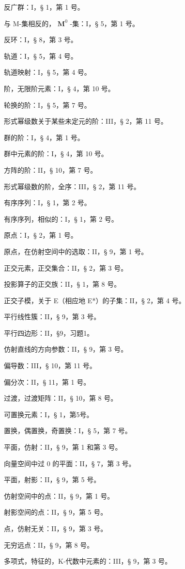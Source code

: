 反广群：I，§ 1，第 1 号。

与 M-集相反的， \(\mathbf{M}^0\) -集：I，§ 5，第 1 号。

反环：I，§ 8，第 3 号。

轨道：I，§ 5，第 4 号。

轨道映射：I，§ 5，第 4 号。

阶，无限阶元素：I，§ 4，第 10 号。

轮换的阶：I，§ 5，第 7 号。

形式幂级数关于某些未定元的阶：III，§ 2，第 11 号。

群的阶：I，§ 4，第 1 号。

群中元素的阶：I，§ 4，第 10 号。

方阵的阶：II，§ 10，第 7 号。

形式幂级数的阶，全序：III，§ 2，第 11 号。

有序序列：I，§ 1，第 2 号。

有序序列，相似的：I，§ 1，第 2 号。

原点：I，§ 2，第 1 号。

原点，在仿射空间中的选取：II，§ 9，第 1 号。

正交元素，正交集合：II，§ 2，第 3 号。

投影算子的正交族：II，§ 1，第 8 号。

正交子模，关于 E（相应地 E*）的子集：II，§ 2，第 4 号。

平行线性簇：II，§ 9，第 3 号。

平行四边形：II，§9，习题1。

仿射直线的方向参数：II，§ 9，第 3 号。

偏导数：III，§ 10，第 11 号。

偏分次：II，§ 11，第 1 号。

过渡，过渡矩阵：II，§ 10，第 8 号。

可置换元素：I，§ 1，第5号。

置换，偶置换，奇置换：I，§ 5，第 7 号。

平面，仿射：II，§ 9，第 1 和第 3 号。

向量空间中过 0 的平面：II，§ 7，第 3 号。

平面，射影：II，§ 9，第 5 号。

仿射空间中的点：II，§ 9，第 1 号。

射影空间的点：II，§ 9，第 5 号。

点，仿射无关：II，§ 9，第 3 号。

无穷远点：II，§ 9，第 8 号。

多项式，特征的，K-代数中元素的：III，§ 9，第 3 号。

